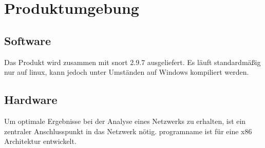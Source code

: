 \chapter{Produktumgebung}

\section{Software}
Das Produkt wird zusammen mit \gls{snort} 2.9.7 ausgeliefert. Es läuft standardmäßig nur auf \gls{linux}, kann jedoch unter Umständen auf Windows kompiliert werden.

\section{Hardware}
Um optimale Ergebnisse bei der Analyse eines Netzwerks zu erhalten, ist ein zentraler Anschlusspunkt in das Netzwerk nötig.
\gls{programname} ist für eine \gls{x86} Architektur entwickelt.
